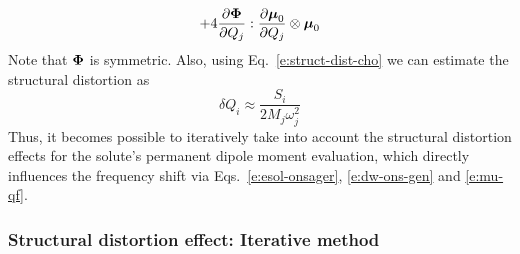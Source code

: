 \documentclass[a4paper,titlepage,twoside,fleqn,12pt]{book}
\newcommand{\BM}[1]{\ensuremath{\mbox{\boldmath${#1}$}}}
\newcommand{\fderiv}[2]{\ensuremath{
\frac{\partial #1}{\partial #2}}}
\begin{document}
\begin{refsection}
\begin{subequations}
\begin{align}
           + 4\fderiv{{\BM \Phi}}{Q_j} : \fderiv{{\BM \mu}_0}{Q_j} \otimes {\BM \mu}_0  \label{e:ons-ki-init}
 \end{align}
\end{subequations}
%
Note that ${\BM \Phi}$ is symmetric. Also, using Eq.~\eqref{e:struct-dist-cho}
we can estimate the structural distortion as
%
\begin{equation} \label{e:ons-dq-init}
\delta Q_i \approx \frac{S_i}{2M_j\omega_j^2}
\end{equation}
%
Thus, it becomes possible to iteratively take into account 
the structural distortion effects for the solute's permanent
dipole moment evaluation, which directly influences the 
frequency shift via Eqs.~\eqref{e:esol-onsager}, 
\eqref{e:dw-ons-gen} and \eqref{e:mu-qf}. 

\subsubsection{Structural distortion effect: Iterative method}


\end{refsection}
\end{document}
